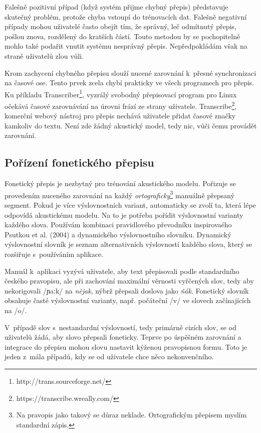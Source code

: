 Falešně pozitivní případ (když systém přijme chybný přepis) představuje skutečný
problém, protože chyba vstoupí do trénovacích dat. Falešně negativní případy
mohou uživatelé často obejít tím, že správný, leč odmítnutý přepis, pošlou
znova, rozdělený do kratších částí. Touto metodou by se pochopitelně mohlo také
podařit vnutit systému nesprávný přepis. Nepředpokládám však na straně uživatelů
zlou vůli.

Krom zachycení chybného přepisu slouží nucené zarovnání k~přesné synchronizaci
na časové ose. Tento prvek zcela chybí prakticky ve všech programech pro přepis.
Ku příkladu Transcriber\footnote{http://trans.sourceforge.net/}, vyzrálý
svobodný přepisovací program pro Linux očekává časové zarovnávání na úrovni
frází ze strany uživatele. Transcribe\footnote{https://transcribe.wreally.com/},
komerční webový nástroj pro přepis nechává uživatele přidat časové značky
kamkoliv do textu. Není zde žádný akustický model, tedy nic, vůči čemu provádět
zarovnání.

\subsection{Pořízení fonetického přepisu}
\label{ssec:porizeni-fonetickeho-prepisu}

Fonetický přepis je nezbytný pro trénování akustického modelu. Pořizuje se
provedením nuceného zarovnání na každý {\em ortograficky}\footnote{Na pravopis jako takový se důraz neklade. Ortografickým přepisem myslím standardní zápis.} manuálně přepsaný segment. Pokud je více
výslovnostních variant, automaticky se zvolí ta, která lépe odpovídá akustickému
modelu. Na to je potřeba pořídit výslovnostní varianty každého slova. Používám
kombinaci pravidlového převodníku inspirovaého Psutkou et
al. (2004)\cite{psutka2004development} a dynamického výslovnostního slovníku. Dynamický
výslovnostní slovník je seznam alternativních výslovností každého slova, který
se rozšiřuje s~používáním aplikace.

Manuál k~aplikaci vyzývá uživatele, aby text přepisovali podle standardního
českého pravopisu, ale při zachování maximální věrnosti vyřčených slov, tedy aby
nekorigovali  /ɲaːk/ \normalfont na {\em nějak}, nýbrž
přepsali doslova jako {\em ňák}. Fonetický slovník obsahuje časté výslovnostní
varianty, např. počáteční  /v/ \normalfont ve slovech
začínajících na  /o/.

V~případě slov s~nestandardní výslovností, tedy primárně cizích slov, se od
uživatelů žádá, aby slovo přepsali foneticky. Teprve po úspěšném zarovnání a
integrace do přepisu mohou slovu nastavit kýženou pravopisnou formu. Toto je
jeden z~mála případů, kdy se od uživatele chce něco nekonvenčního.

